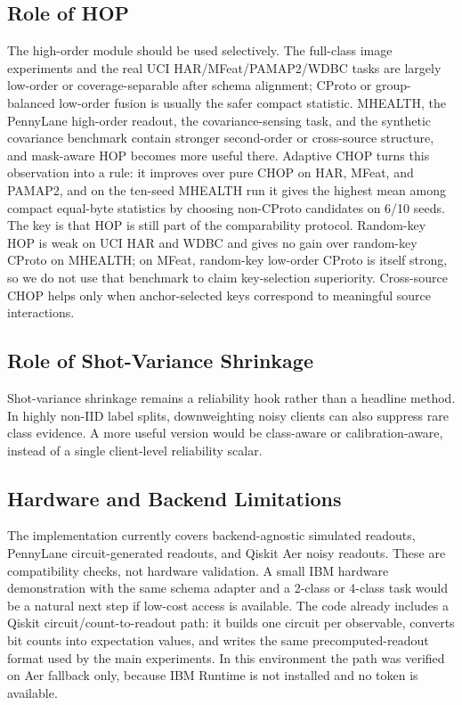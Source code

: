 \documentclass[preprint]{elsarticle}
\begin{document}
\subsection{Role of HOP}

The high-order module should be used selectively. The full-class image experiments and the real UCI HAR/MFeat/PAMAP2/WDBC tasks are largely low-order or coverage-separable after schema alignment; CProto or group-balanced low-order fusion is usually the safer compact statistic. MHEALTH, the PennyLane high-order readout, the covariance-sensing task, and the synthetic covariance benchmark contain stronger second-order or cross-source structure, and mask-aware HOP becomes more useful there. Adaptive CHOP turns this observation into a rule: it improves over pure CHOP on HAR, MFeat, and PAMAP2, and on the ten-seed MHEALTH run it gives the highest mean among compact equal-byte statistics by choosing non-CProto candidates on 6/10 seeds. The key is that HOP is still part of the comparability protocol. Random-key HOP is weak on UCI HAR and WDBC and gives no gain over random-key CProto on MHEALTH; on MFeat, random-key low-order CProto is itself strong, so we do not use that benchmark to claim key-selection superiority. Cross-source CHOP helps only when anchor-selected keys correspond to meaningful source interactions.

\subsection{Role of Shot-Variance Shrinkage}

Shot-variance shrinkage remains a reliability hook rather than a headline method. In highly non-IID label splits, downweighting noisy clients can also suppress rare class evidence. A more useful version would be class-aware or calibration-aware, instead of a single client-level reliability scalar.

\subsection{Hardware and Backend Limitations}

The implementation currently covers backend-agnostic simulated readouts, PennyLane circuit-generated readouts, and Qiskit Aer noisy readouts. These are compatibility checks, not hardware validation. A small IBM hardware demonstration with the same schema adapter and a 2-class or 4-class task would be a natural next step if low-cost access is available. The code already includes a Qiskit circuit/count-to-readout path: it builds one circuit per observable, converts bit counts into expectation values, and writes the same precomputed-readout format used by the main experiments. In this environment the path was verified on Aer fallback only, because IBM Runtime is not installed and no token is available.
\end{document}
